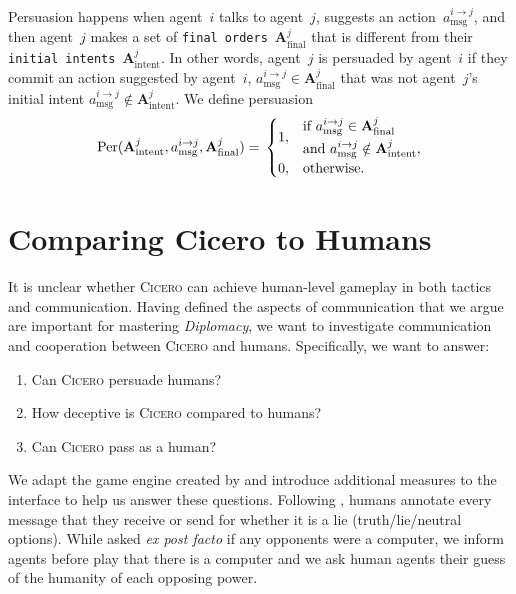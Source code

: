 \documentclass[oneside]{memoir}
\newcommand{\cicero}{\abr{Cicero} }
\newcommand{\abr}[1]{\textsc{#1}}
\begin{document}
Persuasion happens when agent~$i$ talks to agent~$j$, suggests an
action~$a^{i\to j}_{\text{msg}}$, and then agent~$j$ makes a set of
\texttt{final orders}~$\mathbf{A}^{j}_{\text{final}}$ that is different from 
their \texttt{initial intents}~$\mathbf{A}^{j}_{\text{intent}}$. In other words, agent~$j$ is persuaded by agent~$i$ if they commit an action suggested by  agent~$i$, $a^{i\to j}_{\text{msg}} \in \mathbf{A}^{j}_{\text{final}}$ that was not agent~$j$'s initial intent $a^{i\to j}_{\text{msg}} \notin \mathbf{A}^{j}_{\text{intent}}$.
%
We define persuasion 
\begin{equation}
     \text{Per}(\mathbf{A}^{j}_{\text{intent}}, a^{i\to j}_{\text{msg}}, \mathbf{A}^{j}_{\text{final}}) = \\
    \begin{cases}
    1, & 
    \begin{aligned}[c]
    &\text{if } a^{i\to j}_{\text{msg}} \in \mathbf{A}^{j}_{\text{final}} \\
    &\text{and } a^{i\to j}_{\text{msg}} \notin \mathbf{A}^{j}_{\text{intent}},
    \end{aligned} \\
    0, & \text{otherwise.}
    \end{cases}
    \label{eq: per}
\end{equation}

\section{Comparing Cicero to Humans}

It is unclear whether \cicero can
achieve human-level gameplay in both tactics and
communication. Having defined the aspects of communication that we
argue are important for mastering \textit{Diplomacy}, we want to
investigate communication and cooperation between \cicero and
humans. Specifically, we want to answer:
\begin{enumerate}
    \item Can \cicero persuade humans?
    \item How deceptive is \cicero compared to humans? 
    \item Can \cicero pass as a human?
\end{enumerate}

We adapt the game engine created by \citet{NEURIPS2019_84b20b1f} and introduce
additional measures  to the interface to help us answer these
questions.
%
Following \citet{peskov2020takes}, humans annotate every message that they receive or send for whether it is a lie (truth/lie/neutral options). While \citet{meta2022human} asked \textit{ex post facto} if any opponents were a computer, we inform agents before play that there is a computer and we ask human agents their guess of the humanity of each opposing power.
\end{document}
